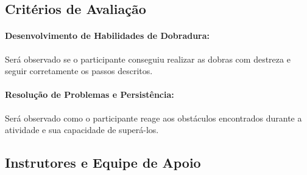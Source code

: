 \documentclass[12pt,a4paper]{article}
\begin{document}
\subsection*{Critérios de Avaliação}

\paragraph{Desenvolvimento de Habilidades de Dobradura:}
Será observado se o participante conseguiu realizar as dobras com destreza
e seguir corretamente os passos descritos.

\paragraph{Resolução de Problemas e Persistência:}
Será observado como o participante reage aos obstáculos encontrados durante
a atividade e sua capacidade de superá-los.

\subsection*{Instrutores e Equipe de Apoio}
\end{document}
